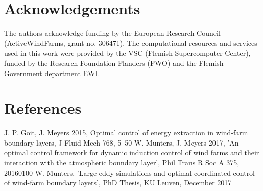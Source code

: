 \documentclass[a4paper]{jpconf}
\begin{document}
\section*{Acknowledgements}
The authors acknowledge funding by the European Research Council (ActiveWindFarms, grant no. 306471). The computational resources and services used in this work were provided by the VSC (Flemish Supercomputer Center), funded by the Research Foundation Flanders (FWO) and the Flemish Government department EWI. 

%		
%		
%		
%		
%		


\section*{References}
\begin{thebibliography}{9}
	 J. P. Goit, J. Meyers 2015, Optimal control of energy extraction in wind-farm boundary layers, J Fluid Mech 768, 5--50
	 W. Munters, J. Meyers 2017, 'An optimal control framework for dynamic induction control of wind farms and their interaction with the atmospheric boundary layer', Phil Trans R Soc A 375, 20160100
	 W. Munters, 'Large-eddy simulations and optimal coordinated control of wind-farm boundary layers', PhD Thesis, KU Leuven, December 2017
\end{thebibliography}
\end{document}
